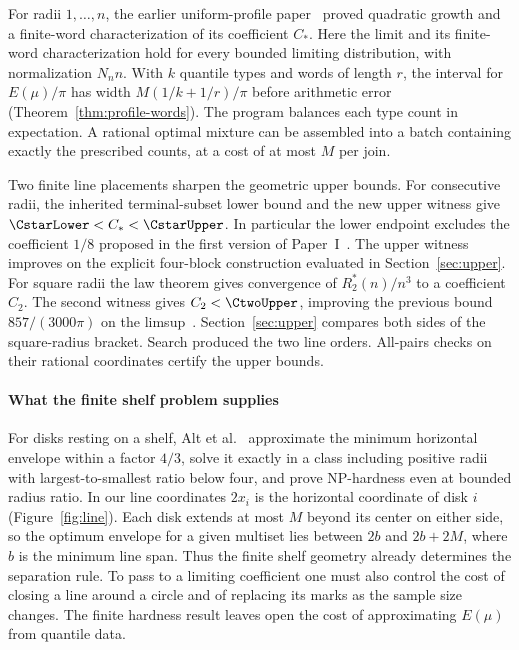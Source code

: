 \documentclass[review,hidelinks,onefignum,onetabnum]{siamart251216}
\newcommand{\CC}{C_\ast}
\begin{document}
For radii $1,\ldots,n$, the earlier uniform-profile paper~\cite{supp}
proved quadratic growth and a finite-word characterization of its
coefficient $\CC$. Here the limit and its finite-word characterization hold for every
bounded limiting distribution, with normalization $N_n n$. With $k$ quantile types
and words of length $r$, the interval for $E(\mu)/\pi$ has width
$M(1/k+1/r)/\pi$ before arithmetic error (Theorem~\ref{thm:profile-words}).
The program balances each type count in expectation. A rational optimal
mixture can be assembled into a batch containing exactly the prescribed
counts, at a cost of at most $M$ per join.

Two finite line placements sharpen the geometric upper bounds. For
consecutive radii, the inherited terminal-subset lower bound and the new
upper witness give $\CstarLower<\CC<\CstarUpper$. In particular the
lower endpoint excludes the coefficient $1/8$ proposed in the first
version of Paper~I~\cite{paperI}. The upper witness
improves on the explicit four-block construction evaluated in
Section~\ref{sec:upper}. For square radii the law theorem gives convergence
of $R_2^*(n)/n^3$ to a coefficient $C_2$. The second witness gives
$C_2<\CtwoUpper$, improving the previous bound $857/(3000\pi)$ on the
limsup~\cite{squared}. Section~\ref{sec:upper} compares both sides of
the square-radius bracket. Search produced the two line orders. All-pairs
checks on their rational coordinates certify the upper bounds.

\paragraph*{What the finite shelf problem supplies}
For disks resting on a shelf, Alt et al.~\cite{shelf} approximate the
minimum horizontal envelope within a factor $4/3$, solve it exactly in
a class including positive radii with largest-to-smallest ratio below four, and prove NP-hardness
even at bounded radius ratio. In our line coordinates $2x_i$ is the
horizontal coordinate of disk $i$ (Figure~\ref{fig:line}). Each disk
extends at most $M$ beyond its center on either side, so the optimum
envelope for a given multiset lies between $2b$ and $2b+2M$, where
$b$ is the minimum line span. Thus the finite shelf geometry already
determines the separation rule. To pass to a limiting coefficient one
must also control the cost of closing a line around a circle and of
replacing its marks as the sample size changes. The finite hardness
result leaves open the cost of approximating $E(\mu)$ from quantile data.
\end{document}
